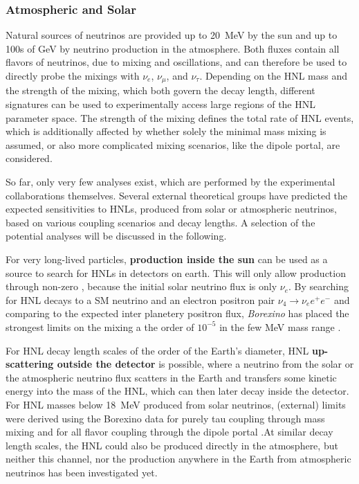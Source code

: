 

\subsubsection{Atmospheric and Solar}

Natural sources of neutrinos are provided up to \SI{20}{\mega\electronvolt} by the sun and up to 100s of \si{\giga\electronvolt} by neutrino production in the atmosphere. Both fluxes contain all flavors of neutrinos, due to mixing and oscillations, and can therefore be used to directly probe the mixings with $\nu_e$, $\nu_\mu$, and $\nu_\tau$. Depending on the HNL mass and the strength of the mixing, which both govern the decay length, different signatures can be used to experimentally access large regions of the HNL parameter space. The strength of the mixing defines the total rate of HNL events, which is additionally affected by whether solely the minimal mass mixing is assumed, or also more complicated mixing scenarios, like the dipole portal, are considered.

So far, only very few analyses exist, which are performed by the experimental collaborations themselves. Several external theoretical groups have predicted the expected sensitivities to HNLs, produced from solar or atmospheric neutrinos, based on various coupling scenarios and decay lengths. A selection of the potential analyses will be discussed in the following.

For very long-lived particles, \textbf{production inside the sun} can be used as a source to search for HNLs in detectors on earth. This will only allow production through non-zero , because the initial solar neutrino flux is only $\nu_e$. By searching for HNL decays to a SM neutrino and an electron positron pair $\nu_4 \rightarrow \nu_e e^+ e^-$ and comparing to the expected inter planetery positron flux, \textit{Borexino} has placed the strongest limits on the mixing  a the order of $10^{-5}$ in the few \si{\mega\electronvolt} mass range .

For HNL decay length scales of the order of the Earth's diameter, HNL \textbf{up-scattering outside the detector} is possible, where a neutrino from the solar or the atmospheric neutrino flux scatters in the Earth and transfers some kinetic energy into the mass of the HNL, which can then later decay inside the detector. For HNL masses below \SI{18}{\mega\electronvolt} produced from solar neutrinos, (external) limits were derived using the Borexino data for purely tau coupling through mass mixing  and for all flavor coupling through the dipole portal .At similar decay length scales, the HNL could also be produced directly in the atmosphere, but neither this channel, nor the production anywhere in the Earth from atmospheric neutrinos has been investigated yet.

